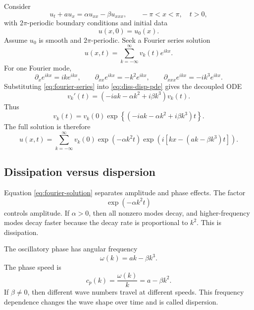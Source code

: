 \documentclass[11pt]{article}
\begin{document}
Consider
\begin{equation}
    u_t+a u_x=\alpha u_{xx}-\beta u_{xxx},
    \qquad -\pi<x<\pi,\quad t>0,
    \label{eq:diss-disp-pde}
\end{equation}
with $2\pi$-periodic boundary conditions and initial data
\begin{equation}
    u(x,0)=u_0(x).
\end{equation}
Assume $u_0$ is smooth and $2\pi$-periodic.  Seek a Fourier series solution
\begin{equation}
    u(x,t)=\sum_{k=-\infty}^{\infty}v_k(t)e^{ikx}.
    \label{eq:fourier-series}
\end{equation}
For one Fourier mode,
\begin{equation}
    \partial_x e^{ikx}=ik e^{ikx},\qquad
    \partial_{xx} e^{ikx}=-k^2 e^{ikx},\qquad
    \partial_{xxx} e^{ikx}=-ik^3e^{ikx}.
\end{equation}
Substituting \eqref{eq:fourier-series} into \eqref{eq:diss-disp-pde} gives the decoupled ODE
\begin{equation}
    v_k'(t)
    =
    \left(-iak-\alpha k^2+i\beta k^3\right)v_k(t).
    \label{eq:mode-ode}
\end{equation}
Thus
\begin{equation}
    v_k(t)
    =
    v_k(0)
    \exp\left\{\left(-iak-\alpha k^2+i\beta k^3\right)t\right\}.
    \label{eq:mode-solution}
\end{equation}
The full solution is therefore
\begin{equation}
    u(x,t)
    =
    \sum_{k=-\infty}^{\infty}
    v_k(0)
    \exp(-\alpha k^2 t)
    \exp\left(i\left[kx-(ak-\beta k^3)t\right]\right).
    \label{eq:fourier-solution}
\end{equation}

\subsection{Dissipation versus dispersion}

Equation \eqref{eq:fourier-solution} separates amplitude and phase effects.  The factor
\begin{equation}
    \exp(-\alpha k^2t)
\end{equation}
controls amplitude.  If $\alpha>0$, then all nonzero modes decay, and higher-frequency modes decay faster because the decay rate is proportional to $k^2$.  This is dissipation.

The oscillatory phase has angular frequency
\begin{equation}
    \omega(k)=ak-\beta k^3.
\end{equation}
The phase speed is
\begin{equation}
    c_p(k)=\frac{\omega(k)}{k}=a-\beta k^2.
\end{equation}
If $\beta\neq 0$, then different wave numbers travel at different speeds.  This frequency dependence changes the wave shape over time and is called dispersion.
\end{document}
